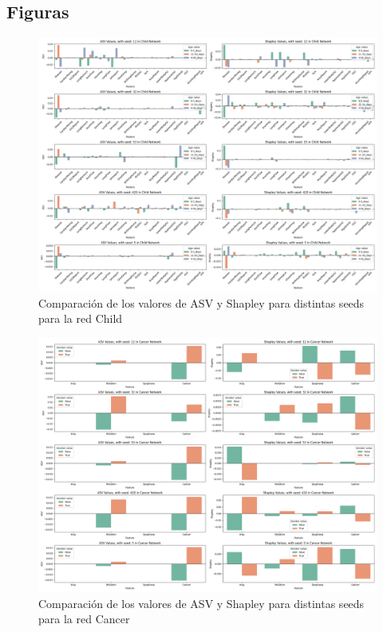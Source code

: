 \newpage

\subsection{Figuras}

\begin{figure}[ht]
    \centering
    \includegraphics[scale=0.3]{img/asvResults/childMultipleSeedsASVandShapley.png}
    \caption{Comparación de los valores de ASV y Shapley para distintas seeds para la red Child}
    \label{fig:multipleSeedsASVvsShapleyChild}
\end{figure}

\begin{figure}[ht]
    \centering
    \includegraphics[scale=0.3]{img/asvResults/cancerMultipleSeedsASVandShapley.png}
    \caption{Comparación de los valores de ASV y Shapley para distintas seeds para la red Cancer}
    \label{fig:multipleSeedsASVvsShapleyCancer}
\end{figure}
